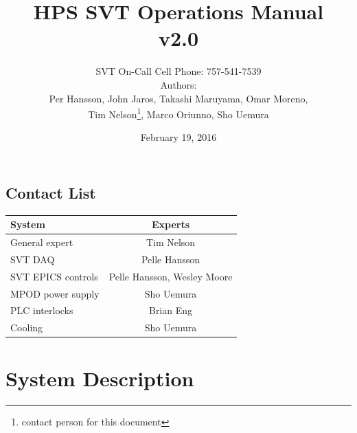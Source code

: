 \documentclass[12pt]{report}
\title{HPS SVT Operations Manual \\ v2.0}
\author{SVT On-Call Cell Phone: 757-541-7539 \\ 
Authors: \\
Per Hansson, John Jaros, Takashi Maruyama, Omar Moreno,\\ Tim Nelson\footnote{contact person for this document}, Marco Oriunno, Sho Uemura}
\date{February 19, 2016} %
\begin{document}
\maketitle

\tableofcontents

\newpage

\section{Contact List}

\begin{center}
\begin{tabular}{lc}
\hline \hline 
System & Experts \\
\hline
General expert & Tim Nelson \\
SVT DAQ & Pelle Hansson \\
SVT EPICS controls & Pelle Hansson, Wesley Moore \\
MPOD power supply & Sho Uemura \\
PLC interlocks & Brian Eng \\
Cooling & Sho Uemura \\
 \hline \hline
\end{tabular}
\end{center}

\chapter{System Description}
\end{document}
